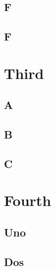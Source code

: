 \documentclass[draft]{uoflthesis} %
\begin{document}
\lipsum

\section{F}

\lipsum

\section{F}

\lipsum

\chapter{Third}

\section{A}

\lipsum

\section{B}

\lipsum

\section{C}

\lipsum

\chapter{Fourth}

\section{Uno}

\lipsum

\section{Dos}

\lipsum[1-150]
\end{document}
